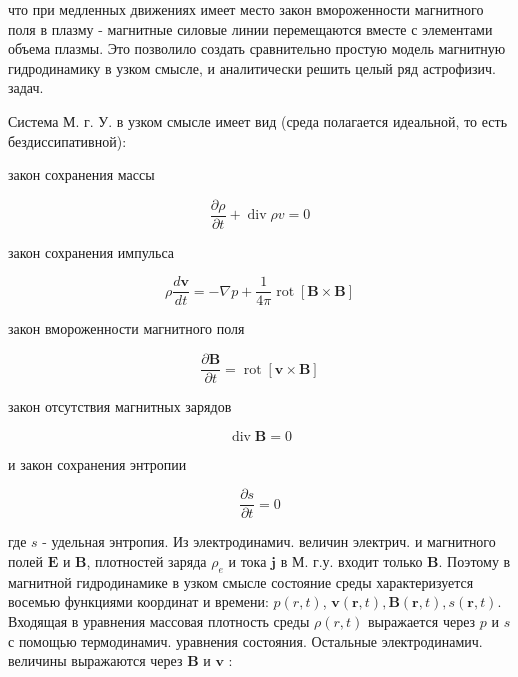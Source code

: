 \documentclass[10pt]{article}
\begin{document}
что при медленных движениях имеет место закон вмороженности магнитного поля в плазму - магнитные силовые линии перемещаются вместе с элементами объема плазмы. Это позволило создать сравнительно простую модель магнитную гидродинамику в узком смысле, и аналитически решить целый ряд астрофизич. задач.



Система М. г. У. в узком смысле имеет вид (среда полагается идеальной, то есть бездиссипативной):



закон сохранения массы



\[

\frac{\partial \rho}{\partial t}+\operatorname{div} \rho v=0

\]



закон сохранения импульса



\[

\rho \frac{d \boldsymbol{v}}{d t}=-\nabla p+\frac{1}{4 \pi} \operatorname{rot}[\boldsymbol{B} \times \boldsymbol{B}]

\]



закон вмороженности магнитного поля



\[

\frac{\partial \boldsymbol{B}}{\partial t}=\operatorname{rot}[\boldsymbol{v} \times \boldsymbol{B}]

\]



закон отсутствия магнитных зарядов



\[

\operatorname{div} \boldsymbol{B}=0

\]



и закон сохранения энтропии



\[

\frac{\partial s}{\partial t}=0

\]



где $s$ - удельная энтропия. Из электродинамич. величин электрич. и магнитного полей $\boldsymbol{E}$ и $\boldsymbol{B}$, плотностей заряда $\rho_{e}$ и тока $\boldsymbol{j}$ в М. г.у. входит только $\boldsymbol{B}$. Поэтому в магнитной гидродинамике в узком смысле состояние среды характеризуется восемью функциями координат и времени: $p(r, t)$, $\boldsymbol{v}(\boldsymbol{r}, t), \boldsymbol{B}(\boldsymbol{r}, t), s(\boldsymbol{r}, t)$. Входящая в уравнения массовая плотность среды $\rho(r, t)$ выражается через $p$ и $s$ с помощью термодинамич. уравнения состояния. Остальные электродинамич. величины выражаются через $\boldsymbol{B}$ и $\boldsymbol{v}$ :
\end{document}

